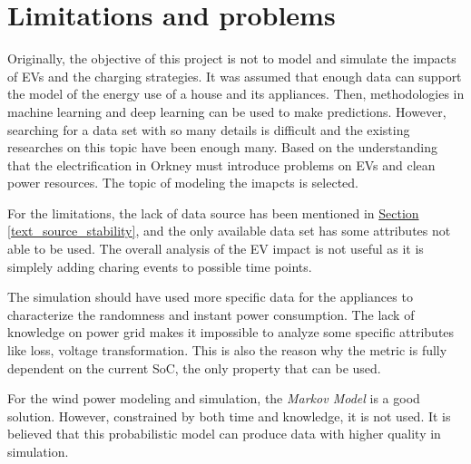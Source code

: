 \documentclass[12pt,a4paper]{report}
\begin{document}
        \section{Limitations and problems}
        Originally, the objective of this project is not to model and simulate the impacts of EVs and the charging strategies. It was assumed that enough data can support the model of the energy use of a house and its appliances. Then, methodologies in machine learning and deep learning can be used to make predictions. However, searching for a data set with so many details is difficult and the existing researches on this topic have been enough many. Based on the understanding that the electrification in Orkney must introduce problems on EVs and clean power resources. The topic of modeling the imapcts is selected.

        For the limitations, the lack of data source has been mentioned in \hyperref[text_source_stability]{Section \ref*{text_source_stability}}, and the only available data set has some attributes not able to be used. The overall analysis of the EV impact is not useful as it is simplely adding charing events to possible time points.

        The simulation should have used more specific data for the appliances to characterize the randomness and instant power consumption. The lack of knowledge on power grid makes it impossible to analyze some specific attributes like loss, voltage transformation. This is also the reason why the metric is fully dependent on the current SoC, the only property that can be used.

        For the wind power modeling and simulation, the \emph{Markov Model} is a good solution. However, constrained by both time and knowledge, it is not used. It is believed that this probabilistic model can produce data with higher quality in simulation.
            
\end{document}
